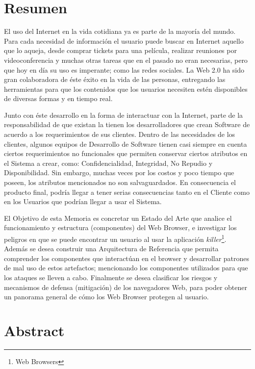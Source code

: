 
\section*{Resumen}
\label{chap:resumen}

El uso del Internet en la vida cotidiana ya es parte de la mayoría del mundo. Para cada necesidad de información el usuario puede buscar en Internet aquello que lo aqueja, desde comprar tickets para una película, realizar reuniones por videoconferencia y muchas otras tareas que en el pasado no eran necesarias, pero que hoy en día su uso es imperante; como las redes sociales. La Web 2.0 ha sido gran colaboradora de éste éxito en la vida de las personas, entregando las herramientas para que los contenidos que los usuarios necesiten estén disponibles de diversas formas y en tiempo real.

Junto con éste desarrollo en la forma de interactuar con la Internet, parte de la responsabilidad de que existan la tienen los desarrolladores que crean Software de acuerdo a los requerimientos de sus clientes. Dentro de las necesidades de los clientes, algunos equipos de Desarrollo de Software tienen casi siempre en cuenta ciertos requerimientos no funcionales que permiten conservar ciertos atributos en el Sistema a crear, como: Confidencialidad, Integridad, No Repudio y Disponibilidad. Sin embargo, muchas veces por los costos y poco tiempo que poseen, los atributos mencionados no son salvaguardados. En consecuencia el producto final, podría llegar a tener serias consecuencias tanto en el Cliente como en los Usuarios que podrían llegar a usar el Sistema.

El Objetivo de esta Memoria es concretar un Estado del Arte que analice el funcionamiento y estructura (componentes) del Web Browser, e investigar los peligros en que se puede encontrar un usuario al usar la aplicación \textit{killer}\footnote{Web Browsers}. Además se desea construir una Arquitectura de Referencia que permita comprender los componentes que interactúan en el browser y desarrollar patrones de mal uso de estos artefactos; mencionando los componentes utilizados para que los ataques se lleven a cabo. Finalmente se desea clasificar los riesgos y mecanismos de defensa (mitigación) de los navegadores Web, para poder obtener un panorama general de cómo los Web Browser protegen al usuario.


\section*{Abstract}
\label{chap:abstract}

